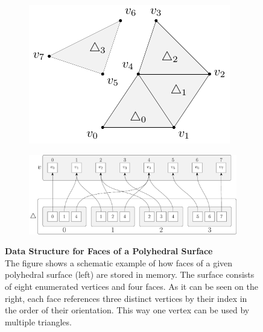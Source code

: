 \documentclass{stdlocal}
\begin{document}
  \begin{figure}[b]
    \centering
    \begin{subfigure}[c]{0.35\linewidth}
      \centering
      \includegraphics[width=\linewidth]{figures/polyhedral-surface-struct-base-scheme.pdf}
    \end{subfigure}
    \hfill
    \begin{subfigure}[c]{0.63\linewidth}
      \centering
      \includegraphics[width=\linewidth]{figures/polyhedral-surface-struct-base.pdf}
    \end{subfigure}
    \caption[Data Structure for Faces of a Polyhedral Surface]{%
      \textbf{Data Structure for Faces of a Polyhedral Surface}\\
      The figure shows a schematic example of how faces of a given polyhedral surface (left) are stored in memory.
      The surface consists of eight enumerated vertices and four faces.
      As it can be seen on the right, each face references three distinct vertices by their index in the order of their orientation.
      This way one vertex can be used by multiple triangles.
    }
    \label{fig:polyhedral-surface-faces}
  \end{figure}
\end{document}
